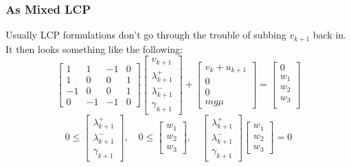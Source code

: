 \documentclass{article}
\begin{document}
\subsubsection{As Mixed LCP}
Usually LCP formulations don't go through the trouble of subbing $v_{k+1}$ back in. It then looks something like the following:
\[
    \begin{bmatrix}
        1 & 1 & -1 & 0 \\
        1 & 0 & 0 & 1\\
        -1 & 0 & 0 & 1 \\
        0 & -1 & -1 & 0
    \end{bmatrix}
    \begin{bmatrix}
        v_{k+1} \\
        \lambda^+_{k+1} \\
        \lambda^-_{k+1} \\
        \gamma_{k+1}
    \end{bmatrix}
    +
    \begin{bmatrix}
        v_k + u_{k+1} \\
        0 \\
        0 \\
        m g \mu
    \end{bmatrix}
    =
    \begin{bmatrix}
        0 \\
        w_1 \\
        w_2 \\
        w_3 \\
    \end{bmatrix}
\]
\[
    0 \leq 
    \begin{bmatrix}
        \lambda^+_{k+1} \\
        \lambda^-_{k+1} \\
        \gamma_{k+1}
    \end{bmatrix}, \quad
    0 \leq 
    \begin{bmatrix}
        w_1 \\
        w_2 \\
        w_3
    \end{bmatrix}, \quad
    \begin{bmatrix}
        \lambda^+_{k+1} \\
        \lambda^-_{k+1} \\
        \gamma_{k+1}
    \end{bmatrix}
    \begin{bmatrix}
        w_1 \\
        w_2 \\
        w_3
    \end{bmatrix}
    = 0
\]
\end{document}
